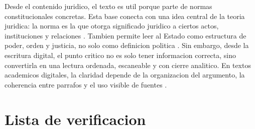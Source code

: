 \documentclass[12pt,letterpaper,oneside]{article}
\begin{document}
Desde el contenido juridico, el texto es util porque parte de normas constitucionales concretas. Esta base conecta con una idea central de la teoria juridica: la norma es la que otorga significado juridico a ciertos actos, instituciones y relaciones \citep{kelsen1982}. Tambien permite leer al Estado como estructura de poder, orden y justicia, no solo como definicion politica \citep{paredes2020,rojas2018}. Sin embargo, desde la escritura digital, el punto critico no es solo tener informacion correcta, sino convertirla en una lectura ordenada, escaneable y con cierre analitico. En textos academicos digitales, la claridad depende de la organizacion del argumento, la coherencia entre parrafos y el uso visible de fuentes \citep{corte2019}.

\section{Lista de verificacion}
\end{document}

